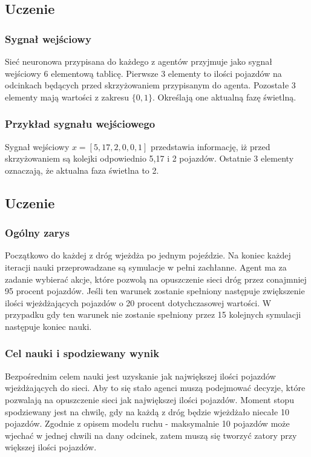 \documentclass[12pt]{book}
\theoremstyle{plain}
\begin{document}
\subsection{Uczenie}
\subsubsection*{Sygnał wejściowy}
Sieć neuronowa przypisana do każdego z agentów przyjmuje jako sygnał wejściowy 6 elementową tablicę. Pierwsze 3 elementy to ilości pojazdów na odcinkach będących przed skrzyżowaniem przypisanym do agenta. Pozostałe 3 elementy mają wartości z zakresu $\{0,1\}$. Określają one aktualną fazę świetlną. 
\subsubsection*{Przykład sygnału wejściowego}
Sygnał wejściowy $x=[5,17,2,0,0,1]$ przedstawia informację, iż przed skrzyżowaniem są kolejki odpowiednio 5,17 i 2 pojazdów. Ostatnie 3 elementy oznaczają, że aktualna faza świetlna to 2.

\subsection*{Uczenie}
\subsubsection{Ogólny zarys}
Początkowo do każdej z dróg wjeżdża po jednym pojeździe. Na koniec każdej iteracji nauki przeprowadzane są symulacje w pełni zachłanne. Agent ma za zadanie wybierać akcje, które pozwolą na opuszczenie sieci dróg przez conajmniej 95 procent pojazdów. Jeśli ten warunek zostanie spełniony następuje zwiększenie ilości wjeżdżających pojazdów o 20 procent dotychczasowej wartości. W przypadku gdy ten warunek nie zostanie spełniony przez 15 kolejnych symulacji następuje koniec nauki. 
\subsubsection*{Cel nauki i spodziewany wynik}
Bezpośrednim celem nauki jest uzyskanie jak największej ilości pojazdów wjeżdżających do sieci. Aby to się stało agenci muszą podejmować decyzje, które pozwalają na opuszczenie sieci jak największej ilości pojazdów. Moment stopu spodziewany jest na chwilę, gdy na każdą z dróg będzie wjeżdżało niecałe 10 pojazdów. Zgodnie z opisem modelu ruchu - maksymalnie 10 pojazdów może wjechać w jednej chwili na dany odcinek, zatem muszą się tworzyć zatory przy większej ilości pojazdów.
\end{document}
